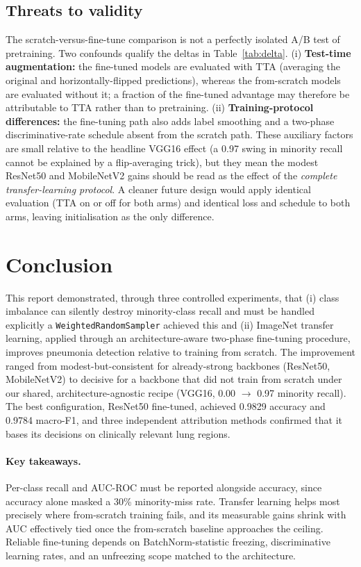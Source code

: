 \documentclass[11pt,a4paper]{article}
\numberwithin{figure}{section}
\numberwithin{table}{section}
\let\oldsection\section
\renewcommand{\section}{\clearpage\oldsection}
\begin{document}
\subsection{Threats to validity}
\label{sec:threats}
The scratch-versus-fine-tune comparison is not a perfectly isolated A/B test of pretraining. Two
confounds qualify the deltas in Table~\ref{tab:delta}. (i) \textbf{Test-time augmentation:} the
fine-tuned models are evaluated with TTA (averaging the original and horizontally-flipped predictions),
whereas the from-scratch models are evaluated without it; a fraction of the fine-tuned advantage may
therefore be attributable to TTA rather than to pretraining. (ii) \textbf{Training-protocol
differences:} the fine-tuning path also adds label smoothing and a two-phase discriminative-rate schedule
absent from the scratch path. These auxiliary factors are small relative to the headline VGG16 effect (a
0.97 swing in minority recall cannot be explained by a flip-averaging trick), but they mean the modest
ResNet50 and MobileNetV2 gains should be read as the effect of the \emph{complete transfer-learning
protocol}. A cleaner future design would apply identical evaluation (TTA on or off for both arms) and
identical loss and schedule to both arms, leaving initialisation as the only difference.

\section{Conclusion}
This report demonstrated, through three controlled experiments, that (i) class imbalance can silently
destroy minority-class recall and must be handled explicitly a \texttt{WeightedRandomSampler} achieved
this and (ii) ImageNet transfer learning, applied through an architecture-aware two-phase fine-tuning
procedure, improves pneumonia detection relative to training from scratch. The improvement ranged from
modest-but-consistent for already-strong backbones (ResNet50, MobileNetV2) to decisive for a backbone
that did not train from scratch under our shared, architecture-agnostic recipe (VGG16, 0.00 $\rightarrow$
0.97 minority recall). The best configuration, ResNet50 fine-tuned, achieved 0.9829 accuracy and 0.9784
macro-F1, and three independent attribution methods confirmed that it bases its decisions on clinically
relevant lung regions.

\paragraph{Key takeaways.} Per-class recall and AUC-ROC must be reported alongside accuracy, since
accuracy alone masked a 30\% minority-miss rate. Transfer learning helps most precisely where
from-scratch training fails, and its measurable gains shrink with AUC effectively tied once the
from-scratch baseline approaches the ceiling. Reliable fine-tuning depends on BatchNorm-statistic
freezing, discriminative learning rates, and an unfreezing scope matched to the architecture.
\end{document}
